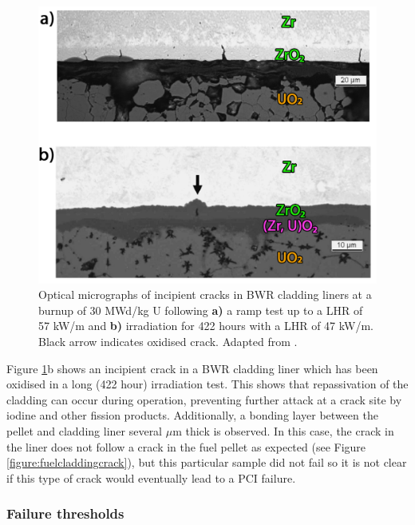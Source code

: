 \begin{figure}[ht] %
\centering
\includegraphics[width=14.5cm]{images/linercracks.png}
\caption[Optical micrographs of incipient cracks in BWR cladding liners at a burnup of 30 MWd/kg U following \textbf{a)} a ramp test up to a LHR of 57 kW/m and \textbf{b)} irradiation for 422 hours with a LHR of 47 kW/m. Black arrow indicates oxidised crack.]{Optical micrographs of incipient cracks in BWR cladding liners at a burnup of 30 MWd/kg U following \textbf{a)} a ramp test up to a LHR of 57 kW/m and \textbf{b)} irradiation for 422 hours with a LHR of 47 kW/m. Black arrow indicates oxidised crack. Adapted from \cite{Kitano2006}.}
\label{figure:linercracks}
\end{figure}

Figure \ref{figure:linercracks}b shows an incipient crack in a BWR cladding liner which has been oxidised in a long (422 hour) irradiation test. This shows that repassivation of the cladding can occur during operation, preventing further attack at a crack site by iodine and other fission products. Additionally, a bonding layer between the pellet and cladding liner several $\mu$m thick is observed. In this case, the crack in the liner does not follow a crack in the fuel pellet as expected (see Figure \ref{figure:fuelcladdingcrack}), but this particular sample did not fail so it is not clear if this type of crack would eventually lead to a PCI failure. 

\subsubsection{Failure thresholds}

